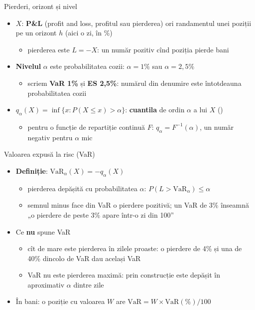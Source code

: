 \begin{frame}{Pierderi, orizont și nivel}
\itemsize{\small}
\begin{itemize}
    \item $X$: \textbf{P\&L} (profit and loss, profitul sau pierderea) ori randamentul unei poziții pe un orizont $h$ (aici o zi, în \%)
    \begin{itemize}
        \item pierderea este $L = -X$: un număr pozitiv cînd poziția pierde bani
    \end{itemize}
    \item \textbf{Nivelul} $\alpha$ este probabilitatea cozii: $\alpha = 1\%$ sau $\alpha = 2{,}5\%$
    \begin{itemize}
        \item scriem \textbf{VaR 1\%} și \textbf{ES 2,5\%}: numărul din denumire este întotdeauna probabilitatea cozii
    \end{itemize}
    \item $q_\alpha(X) = \inf\{x : P(X \le x) > \alpha\}$: \textbf{cuantila} de ordin $\alpha$ a lui $X$ ()
    \begin{itemize}
        \item pentru o funcție de repartiție continuă $F$: $q_\alpha = F^{-1}(\alpha)$, un număr negativ pentru $\alpha$ mic
    \end{itemize}
\end{itemize}
\end{frame}

\begin{frame}{Valoarea expusă la risc (VaR)}
\itemsize{\small}
\begin{itemize}
    \item \textbf{Definiție}: $\mathrm{VaR}_\alpha(X) = -q_\alpha(X)$
    \begin{itemize}
        \item pierderea depășită cu probabilitatea $\alpha$: $P(L > \mathrm{VaR}_\alpha) \le \alpha$
        \item semnul minus face din VaR o pierdere pozitivă; un VaR de 3\% înseamnă „o pierdere de peste 3\% apare într-o zi din 100”
    \end{itemize}
    \item Ce \textbf{nu} spune VaR
    \begin{itemize}
        \item cît de mare este pierderea în zilele proaste: o pierdere de 4\% și una de 40\% dincolo de VaR dau același VaR
        \item VaR nu este pierderea maximă: prin construcție este depășit în aproximativ $\alpha$ dintre zile
    \end{itemize}
    \item În bani: o poziție cu valoarea $W$ are $\mathrm{VaR} = W \times \mathrm{VaR}(\%)/100$
\end{itemize}
\end{frame}

